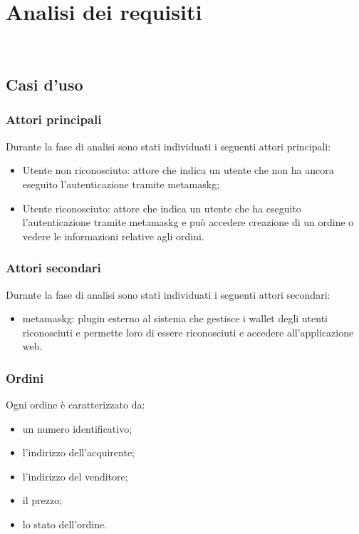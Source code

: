 
\chapter{Analisi dei requisiti}
\label{cap:analisi-requisiti}

\\

\section{Casi d'uso}

\subsection{Attori principali}
Durante la fase di analisi sono stati individuati i seguenti attori principali:
\begin{itemize}
    \item Utente non riconosciuto: attore che indica un utente che non ha ancora eseguito l'autenticazione tramite \gls{metamaskg};
    \item Utente riconosciuto: attore che indica un utente che ha eseguito l'autenticazione tramite \gls{metamaskg} e può accedere creazione di un ordine o vedere le informazioni relative agli ordini.
\end{itemize}

\subsection{Attori secondari}
Durante la fase di analisi sono stati individuati i seguenti attori secondari:
\begin{itemize}
    \item \gls{metamaskg}: plugin esterno al sistema che gestisce i wallet degli utenti riconosciuti e permette loro di essere riconosciuti e accedere all'applicazione web.
\end{itemize}

\subsection{Ordini}
Ogni ordine è caratterizzato da:
\begin{itemize}
    \item un numero identificativo;
    \item l'indirizzo dell'acquirente;
    \item l'indirizzo del venditore;
    \item il prezzo;
    \item lo stato dell'ordine.
\end{itemize}


